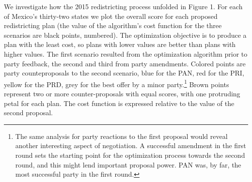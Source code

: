 \documentclass[letter,12pt]{article}
\begin{document}


We investigate how the 2015 redistricting process unfolded in Figure 1. For each of Mexico's thirty-two states we plot the overall score for each proposed redistricting plan (the value of the algorithm's cost function for the three scenarios are black points, numbered). The optimization objective is to produce a plan with the least cost, so plans with lower values are better than plans with higher values. The first scenario resulted from the optimization algorithm prior to party feedback, the second and third from party amendments. Colored points are party counteproposals to the second scenario, blue for the PAN, red for the PRI, yellow for the PRD, grey for the best offer by a minor party.\footnote{The same analysis for party reactions to the first proposal would reveal another interesting aspect of negotiation. A successful amendment in the first round sets the starting point for the optimization process towards the second round, and this might lend important proposal power. PAN was, by far, the most successful party in the first round.} Brown points represent two or more counter-proposals with equal scores, with one protruding petal for each plan. The cost function is expressed relative to the value of the second proposal. 
\end{document}
